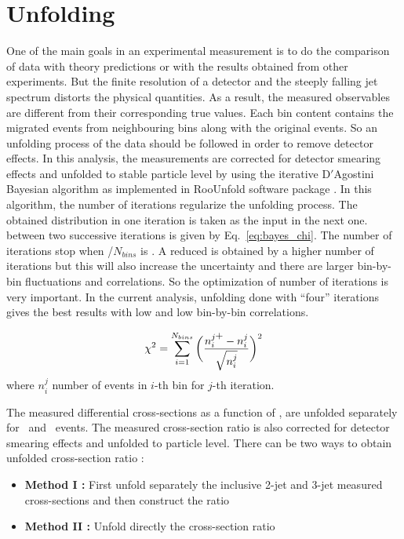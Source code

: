 \section{Unfolding}
\label{sec:unfolding}
One of the main goals in an experimental measurement is to do the comparison of data with theory predictions or with the results obtained from other experiments. But the finite resolution of a detector and the steeply falling jet \pt spectrum distorts the physical quantities. As a result, the measured observables are different from their corresponding true values. Each \pt bin content contains the migrated events from neighbouring bins along with the original events. So an unfolding process of the data should be followed in order to remove detector effects. In this analysis, the measurements are corrected for detector smearing effects and unfolded to stable particle level by using the iterative D$'$Agostini Bayesian algorithm \cite{DAgostini:1994fjx,DAgostini} as implemented in RooUnfold software package \cite{Adye:2011gm}. In this algorithm, the number of iterations regularize the unfolding process. The obtained distribution in one iteration is taken as the input in the next one. \chisq between two successive iterations is given by Eq.~\ref{eq:bayes_chi}. The number of iterations stop when \chisq/$N_{bins}$ is . A reduced \chisq is obtained by a higher number of iterations but this will also increase the uncertainty and there are larger bin-by-bin fluctuations and correlations. So the optimization of number of iterations is very important. In the current analysis, unfolding done with ``four'' iterations gives the best results with low \chisq and low bin-by-bin correlations.

\begin{equation}
\label{eq:bayes_chi}
\chisq = \sum\limits_{i=1}^{N_{bins}}\bigg(\frac{n^{j\plusn}_{i} - n^{j}_{i}}{\sqrt{n^{j}_{i}}}\bigg)^{2}
\end{equation} 
where $n^{j}_{i}$ number of events in $i$-th bin for $j$-th iteration. 

The measured differential cross-sections as a function of \httwo, are unfolded separately for \njt~and \njth~events. The measured cross-section ratio \ratio is also corrected for detector smearing effects and unfolded to particle level. There can be two ways to obtain unfolded cross-section ratio :

\begin{itemize}
\item {\bf Method I :} First unfold separately the inclusive 2-jet and 3-jet measured cross-sections and then construct the ratio \ratio 
\item {\bf Method II :} Unfold directly the cross-section ratio \ratio
\end{itemize}

